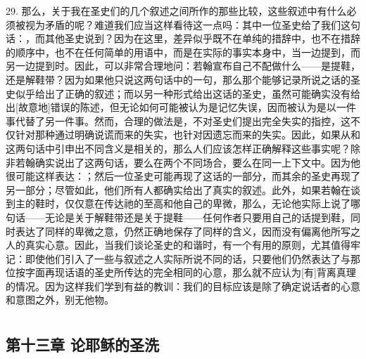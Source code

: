 29. 那么，关于我在圣史们的几个叙述之间所作的那些比较，这些叙述中有什么必须被视为矛盾的呢？难道我们应当这样看待这一点吗：其中一位圣史给了我们这句话：，而其他圣史说到？因为在这里，差异似乎既不在单纯的措辞中，也不在措辞的顺序中，也不在任何简单的用语中，而是在实际的事实本身中，当一边提到，而另一边提到时。因此，可以非常合理地问：若翰宣布自己不配做什么——是提鞋，还是解鞋带？因为如果他只说这两句话中的一句，那么那个能够记录所说之话的圣史似乎给出了正确的叙述；而以另一种形式给出这话的圣史，虽然可能确实没有给出[故意地]错误的陈述，但无论如何可能被认为是记忆失误，因而被认为是以一件事代替了另一件事。然而，合理的做法是，不对圣史们提出完全失实的指控，这不仅针对那种通过明确说谎而来的失实，也针对因遗忘而来的失实。因此，如果从和这两句话中引申出不同含义是相关的，那么人们应该怎样正确解释这些事实呢？除非若翰确实说出了这两句话，要么在两个不同场合，要么在同一上下文中。因为他很可能这样表达：；然后一位圣史可能再现了这话的一部分，而其余的圣史再现了另一部分；尽管如此，他们所有人都确实给出了真实的叙述。此外，如果若翰在谈到主的鞋时，仅仅意在传达祂的至高和他自己的卑微，那么，无论他实际上说了哪句话——无论是关于解鞋带还是关于提鞋——任何作者只要用自己的话提到鞋，同时表达了同样的卑微之意，仍然正确地保存了同样的含义，因而没有偏离他所写之人的真实心意。因此，当我们谈论圣史的和谐时，有一个有用的原则，尤其值得牢记：即使他们引入了一些与叙述之人实际所说不同的话，只要他们仍然表达了与那位按字面再现话语的圣史所传达的完全相同的心意，那么就不应认为[有]背离真理的情况。因为这样我们学到有益的教训：我们的目标应该是除了确定说话者的心意和意图之外，别无他物。\par



\section{}


\subsection{第十三章 论耶稣的圣洗}


